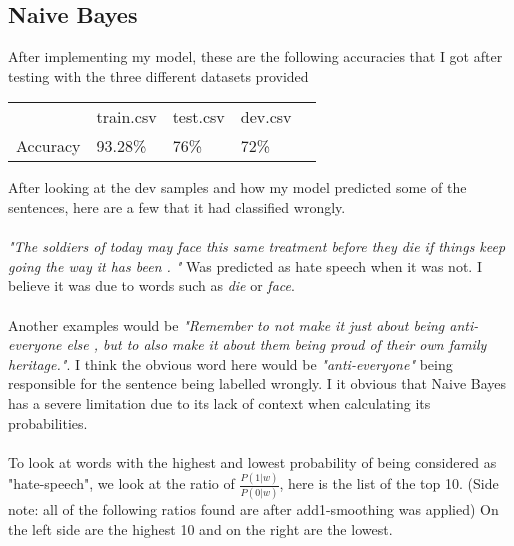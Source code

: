 \documentclass[12pt]{article}
\begin{document}
\subsection{Naive Bayes}
After implementing my model, these are the following accuracies that I got after testing with the three different datasets provided
\begin{table}[!h]
\centering
\begin{tabular}{|l|l|l|l|l}
\cline{1-4}
         & train.csv & test.csv & dev.csv &  \\ \cline{1-4}
Accuracy & 93.28\%   & 76\%     & 72\%    &  \\ \cline{1-4}
\end{tabular}
\end{table}
After looking at the dev samples and how my model predicted some of the sentences, here are a few that it had classified wrongly.\\\\
\textit{"The soldiers of today may face this same treatment before they die if things keep going the way it has been .
"} Was predicted as hate speech when it was not. I believe it was due to words such as \textit{die} or \textit{face}.\\\\
Another examples would be \textit{"Remember to not make it just about being anti-everyone else , but to also make it about them being proud of their own family heritage."}. I think the obvious word here would be \textit{"anti-everyone"} being responsible for the sentence being labelled wrongly. I it obvious that Naive Bayes has a severe limitation due to its lack of context when calculating its probabilities.\\\\
To look at words with the highest and lowest probability of being considered as "hate-speech", we look at the ratio of $\frac{P(1|w)}{P(0|w)}$, here is the list of the top 10. (Side note: all of the following ratios found are after add1-smoothing was applied) On the left side are the highest 10 and on the right are the lowest.
\end{document}
